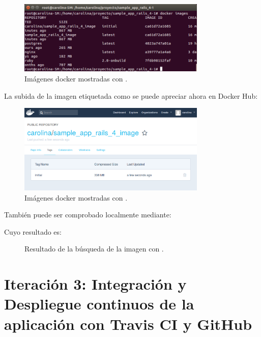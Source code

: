 \begin{figure}[H]
\centering
\includegraphics[width=0.8\textwidth]{images/figures/dockerimages2.png}
\caption{Imágenes docker mostradas con .}
\end{figure}

La subida de la imagen etiquetada como  se puede apreciar ahora en Docker Hub:

\begin{figure}[H]
\centering
\includegraphics[width=0.8\textwidth]{images/figures/dockerhubinitial.png}
\caption{Imágenes docker mostradas con .}
\end{figure}

También puede ser comprobado localmente mediante:


Cuyo resultado es:

\begin{figure}[H]
\caption{Resultado de la búsqueda de la imagen con .}
\end{figure}

\section{Iteración 3: Integración y Despliegue continuos de la aplicación con Travis CI y GitHub}

